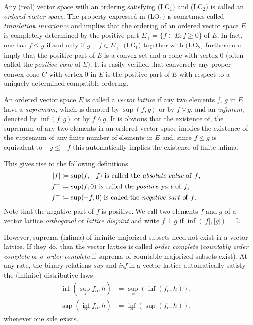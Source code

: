 Any (real) vector space with an ordering satisfying $ \text{(LO$_{1}$)} $ and $ \text{(LO$_{2}$)} $ is called an \emph{ordered vector space}.
The property expressed in $\text{(LO$_{1}$)}$ is sometimes called \emph{translation invariance} and implies that the ordering of an ordered vector space $ E $ is completely determined by the positive part $ E_{+} = \{f \in E \colon f \geq 0\} $ of\/ $ E $.
In fact, one has $ f \leq g $ if and only if\/ $ g - f \in E_{+} $.
$ \text{(LO$_{1}$)} $ together with $ \text{(LO$_{2}$)} $ furthermore imply that the positive part of\/ $ E $ is a convex set and a cone with vertex $ 0 $ (often called the \emph{positive cone} of\/ $ E $).
It is easily verified that conversely any proper convex cone $ C $ with vertex $ 0 $ in $ E $ is the positive part of\/ $ E $ with respect to a uniquely determined compatible ordering.

An ordered vector space $ E $ is called a \emph{vector lattice} if any two elements $ f $, $ g $ in $ E $ have a \emph{supremum}, which is denoted by $ \sup(f,g) $ or by $ f \vee g $, and an \emph{infimum}, denoted by $ \inf(f,g) $ or by $ f \wedge g $.
It is obvious that the existence of, \eg the supremum of any two elements in an ordered vector space implies the existence of the supremum of any finite number of elements in $ E $ and, since $ f \leq g $ is equivalent to $ -g \leq -f $ this automatically implies the existence of finite infima.

This gives rise to the following definitions.
\begin{align*}
	|f| 	& \coloneq \sup(f,-f)  \text{ is called the \emph{absolute value} of\/ $ f $,} \\
	f^{+}	& \coloneq \sup(f,0)   \text{ is called the \emph{positive part} of\/ $ f $,} \\
	f^{-}	& \coloneq \sup(-f,0)  \text{ is called the \emph{negative part} of\/ $ f $.}
\end{align*}
Note that the negative part of\/ $ f $ is positive.
We call two elements $ f $ and $ g $ of a vector lattice \emph{orthogonal} or \emph{lattice disjoint} and write $ f \perp g $ if\/ $ \inf(|f|,|g|) = 0 $.

However, suprema (infima) of infinite majorized subsets need not exist in a vector lattice.
If they do, then the vector lattice is called \emph{order complete} (\emph{countably order complete} or \emph{$ \sigma $-order complete} if suprema of countable majorized subsets exist).
At any rate, the binary relations \emph{sup} and \emph{inf} in a vector lattice automatically satisfy the (infinite) distributive laws
\begin{align*}
\inf(\sup_{\alpha}f_{\alpha},h) & = \sup_{\alpha}(\inf(f_{\alpha},h)), \\
\sup(\inf_{\alpha}f_{\alpha},h) & = \inf_{\alpha}(\sup(f_{\alpha},h)),
\end{align*}
whenever one side exists.

